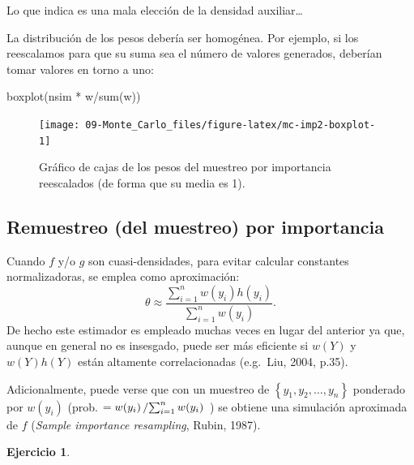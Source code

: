 \documentclass[
]{book}
\newenvironment{Shaded}{\begin{snugshade}}{\end{snugshade}}
\newcommand{\FunctionTok}[1]{\textcolor[rgb]{0.00,0.00,0.00}{#1}}
\newcommand{\NormalTok}[1]{#1}
\newcommand{\SpecialCharTok}[1]{\textcolor[rgb]{0.00,0.00,0.00}{#1}}
\theoremstyle{break}
\theoremstyle{definition}
\theoremstyle{definition}
\theoremstyle{definition}
\newtheorem{exercise}{Ejercicio}[chapter]
\theoremstyle{definition}
\theoremstyle{remark}
\begin{document}
Lo que indica es una mala elección de la densidad auxiliar\ldots{}

La distribución de los pesos debería ser homogénea.
Por ejemplo, si los reescalamos para que su suma sea el número de valores generados, deberían tomar valores en torno a uno:

\begin{Shaded}
\begin{Highlighting}[]
\FunctionTok{boxplot}\NormalTok{(nsim }\SpecialCharTok{*}\NormalTok{ w}\SpecialCharTok{/}\FunctionTok{sum}\NormalTok{(w))  }
\end{Highlighting}
\end{Shaded}

\begin{figure}[!htb]

{\centering \texttt{[image: 09-Monte\_Carlo\_files/figure-latex/mc-imp2-boxplot-1]} 

}

\caption{Gráfico de cajas de los pesos del muestreo por importancia reescalados (de forma que su media es 1).}\label{fig:mc-imp2-boxplot}
\end{figure}

\hypertarget{remuestreo-del-muestreo-por-importancia}{%
\subsection{Remuestreo (del muestreo) por importancia}\label{remuestreo-del-muestreo-por-importancia}}

Cuando \(f\) y/o \(g\) son cuasi-densidades, para evitar calcular constantes normalizadoras, se emplea como aproximación:
\[\theta \approx \frac{\sum\limits_{i=1}^n w(y_i) h\left( y_i\right) }{ \sum\limits_{i=1}^n w(y_i)}.\]
De hecho este estimador es empleado muchas veces en lugar del anterior ya que, aunque en general no es insesgado, puede ser más eficiente si \(w(Y)\) y \(w(Y)h(Y)\) están altamente correlacionadas (e.g.~Liu, 2004, p.35).

Adicionalmente, puede verse que con un muestreo de \(\left\{y_1, y_2, \ldots, y_n \right\}\) ponderado por \(w(y_i)\) (prob. \(=w(y_i)\left/ \sum\nolimits_{i=1}^n w(y_i) \right.\) ) se obtiene una simulación aproximada de \(f\) (\emph{Sample importance resampling}, Rubin, 1987).

\begin{exercise}
\protect\hypertarget{exr:mc-imp-sample}{}{\label{exr:mc-imp-sample} }
\end{exercise}
\end{document}
